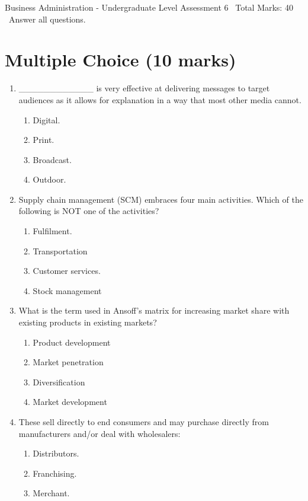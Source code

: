 \documentclass[12pt]{article}
\begin{document}
\begin{center}
Business Administration - Undergraduate Level Assessment 6 \
Total Marks: 40 \
Answer all questions.
\end{center}

\section*{Multiple Choice (10 marks)}
\begin{enumerate}[label=\arabic*.]
\item \_\_\_\_\_\_\_\_\_\_\_\_ is very effective at delivering messages to target audiences as it allows for explanation in a way that most other media cannot.
\begin{enumerate}[label=(\alph*)]
    \item Digital.
    \item Print.
    \item Broadcast.
    \item Outdoor.
\end{enumerate}
\item Supply chain management (SCM) embraces four main activities. Which of the following is NOT one of the activities?
\begin{enumerate}[label=(\alph*)]
    \item Fulfilment.
    \item Transportation
    \item Customer services.
    \item Stock management
\end{enumerate}
\item What is the term used in Ansoff's matrix for increasing market share with existing products in existing markets?
\begin{enumerate}[label=(\alph*)]
    \item Product development
    \item Market penetration
    \item Diversification
    \item Market development
\end{enumerate}
\item These sell directly to end consumers and may purchase directly from manufacturers and/or deal with wholesalers:
\begin{enumerate}[label=(\alph*)]
    \item Distributors.
    \item Franchising.
    \item Merchant.

\end{enumerate}
\end{enumerate}
\end{document}
